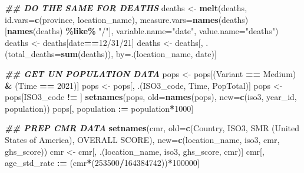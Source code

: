\documentclass[
]{article}
\newenvironment{Shaded}{\begin{snugshade}}{\end{snugshade}}
\newcommand{\AttributeTok}[1]{\textcolor[rgb]{0.13,0.29,0.53}{#1}}
\newcommand{\DecValTok}[1]{\textcolor[rgb]{0.00,0.00,0.81}{#1}}
\newcommand{\DocumentationTok}[1]{\textcolor[rgb]{0.56,0.35,0.01}{\textbf{\textit{#1}}}}
\newcommand{\FunctionTok}[1]{\textcolor[rgb]{0.13,0.29,0.53}{\textbf{#1}}}
\newcommand{\NormalTok}[1]{#1}
\newcommand{\OtherTok}[1]{\textcolor[rgb]{0.56,0.35,0.01}{#1}}
\newcommand{\SpecialCharTok}[1]{\textcolor[rgb]{0.81,0.36,0.00}{\textbf{#1}}}
\newcommand{\StringTok}[1]{\textcolor[rgb]{0.31,0.60,0.02}{#1}}
\begin{document}
\begin{Shaded}
\begin{Highlighting}[]
\DocumentationTok{\#\# DO THE SAME FOR DEATHS}
\NormalTok{deaths }\OtherTok{\textless{}{-}} \FunctionTok{melt}\NormalTok{(deaths, }\AttributeTok{id.vars=}\FunctionTok{c}\NormalTok{(}\StringTok{\textquotesingle{}province\textquotesingle{}}\NormalTok{, }\StringTok{\textquotesingle{}location\_name\textquotesingle{}}\NormalTok{), }\AttributeTok{measure.vars=}\FunctionTok{names}\NormalTok{(deaths)[}\FunctionTok{names}\NormalTok{(deaths) }\SpecialCharTok{\%like\%} \StringTok{"/"}\NormalTok{], }\AttributeTok{variable.name=}\StringTok{"date"}\NormalTok{, }\AttributeTok{value.name=}\StringTok{"deaths"}\NormalTok{)}
\NormalTok{deaths }\OtherTok{\textless{}{-}}\NormalTok{ deaths[date}\SpecialCharTok{==}\StringTok{\textquotesingle{}12/31/21\textquotesingle{}}\NormalTok{]}
\NormalTok{deaths }\OtherTok{\textless{}{-}}\NormalTok{ deaths[, .(}\AttributeTok{total\_deaths=}\FunctionTok{sum}\NormalTok{(deaths)), by}\OtherTok{=}\NormalTok{.(location\_name, date)]}

\DocumentationTok{\#\# GET UN POPULATION DATA}
\NormalTok{pops }\OtherTok{\textless{}{-}}\NormalTok{ pops[(Variant }\SpecialCharTok{==} \StringTok{\textquotesingle{}Medium\textquotesingle{}}\NormalTok{) }\SpecialCharTok{\&}\NormalTok{ (Time }\SpecialCharTok{==} \DecValTok{2021}\NormalTok{)]}
\NormalTok{pops }\OtherTok{\textless{}{-}}\NormalTok{ pops[, .(ISO3\_code, Time, PopTotal)]}
\NormalTok{pops }\OtherTok{\textless{}{-}}\NormalTok{ pops[ISO3\_code }\SpecialCharTok{!=} \StringTok{\textquotesingle{}\textquotesingle{}}\NormalTok{]}
\FunctionTok{setnames}\NormalTok{(pops, }\AttributeTok{old=}\FunctionTok{names}\NormalTok{(pops), }\AttributeTok{new=}\FunctionTok{c}\NormalTok{(}\StringTok{\textquotesingle{}iso3\textquotesingle{}}\NormalTok{, }\StringTok{\textquotesingle{}year\_id\textquotesingle{}}\NormalTok{, }\StringTok{\textquotesingle{}population\textquotesingle{}}\NormalTok{))}
\NormalTok{pops[, population }\SpecialCharTok{:=}\NormalTok{ population}\SpecialCharTok{*}\DecValTok{1000}\NormalTok{]}

\DocumentationTok{\#\# PREP CMR DATA}
\FunctionTok{setnames}\NormalTok{(cmr, }
         \AttributeTok{old=}\FunctionTok{c}\NormalTok{(}\StringTok{\textquotesingle{}Country\textquotesingle{}}\NormalTok{, }\StringTok{\textquotesingle{}ISO3\textquotesingle{}}\NormalTok{, }\StringTok{\textquotesingle{}SMR (United States of America)\textquotesingle{}}\NormalTok{, }\StringTok{\textquotesingle{}OVERALL SCORE\textquotesingle{}}\NormalTok{), }
         \AttributeTok{new=}\FunctionTok{c}\NormalTok{(}\StringTok{\textquotesingle{}location\_name\textquotesingle{}}\NormalTok{, }\StringTok{\textquotesingle{}iso3\textquotesingle{}}\NormalTok{, }\StringTok{\textquotesingle{}cmr\textquotesingle{}}\NormalTok{, }\StringTok{\textquotesingle{}ghs\_score\textquotesingle{}}\NormalTok{))}
\NormalTok{cmr }\OtherTok{\textless{}{-}}\NormalTok{ cmr[, .(location\_name, iso3, ghs\_score, cmr)]}
\NormalTok{cmr[, age\_std\_rate }\SpecialCharTok{:=}\NormalTok{ (cmr}\SpecialCharTok{*}\NormalTok{(}\DecValTok{253500}\SpecialCharTok{/}\DecValTok{164384742}\NormalTok{))}\SpecialCharTok{*}\DecValTok{100000}\NormalTok{]}


\end{Highlighting}
\end{Shaded}
\end{document}
